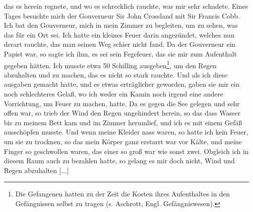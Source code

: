 das es herein regnete, und wo es schrecklich rauchte, was mir
sehr schadete. Eines Tages besuchte mich der Gouverneur Sir
John Crossland mit 
Sir Francis Cobb. Ich 
bat den Gouverneur, mich in mein Zimmer zu begleiten, 
um zu sehen, was das für
ein Ort sei. Ich hatte ein kleines Feuer darin angezündet, welches
nun derart rauchte, das man seinen Weg schier nicht fand. Da
der Gouverneur ein Papist war, so sagte ich ihm, es sei sein
Fegefeuer, das sie mir zum Aufenthalt gegeben hätten. Ich musste
etwa 50 Schilling ausgeben\footnote{Die Gefangenen hatten 
zu der Zeit die Kosten ihres Aufenthaltes in
den Gefängnissen selbst zu tragen (s. Aschrott, Engl. 
Gefängniswesen).}, um den Regen abzuhalten und zu
machen, das es nicht so stark rauchte. Und als ich diese 
ausgaben gemacht hatte, und es etwas erträglicher geworden, gaben
sie mir ein noch schlechteres Gelaß, wo ich weder ein Kamin noch
irgend eine andere Vorrichtung, um Feuer zu machen, hatte. Da
es gegen die See gelegen und sehr offen war, so trieb der Wind
den Regen ungehindert herein, so das dass Wasser bis zu meinem
Bett kam und im Zimmer herumlief, und ich es mit einem Gefäß 
ausschöpfen musste. Und wenn meine Kleider nass waren, so
hatte ich kein Feuer, um sie zu trocknen, so das mein Körper ganz
erstarrt war vor Kälte, und meine Finger so geschwollen waren,
das einer so groß war wie sonst zwei. Obgleich ich in diesem
Raum auch zu bezahlen hatte, so gelang es mir doch nicht, Wind
und Regen abzuhalten [...]

